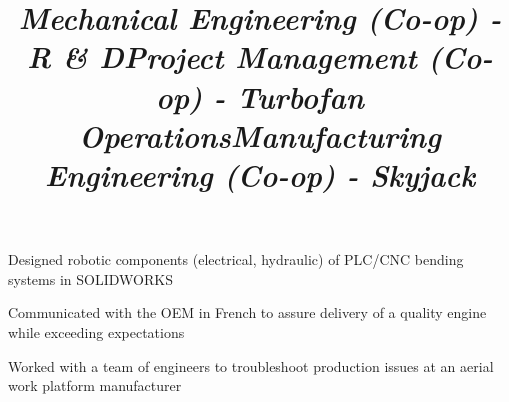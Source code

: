 \documentclass[mm]{res}
\begin{document}
\begin{resume}
\title{\textsl{Mechanical Engineering (Co-op) - R \& D}}
\begin{position}
\tb Designed robotic components (electrical, hydraulic) of PLC/CNC bending systems in SOLIDWORKS
\end{position}

\title{\textsl{Project Management (Co-op) - Turbofan Operations}}
\begin{position}
\tb Communicated with the OEM in French to assure delivery of a quality engine while exceeding expectations
\end{position}

\title{\textsl{Manufacturing Engineering (Co-op) - Skyjack}}
\begin{position}
\tb Worked with a team of engineers to troubleshoot production issues at an aerial work platform manufacturer
\end{position}



\end{resume}
\end{document}
